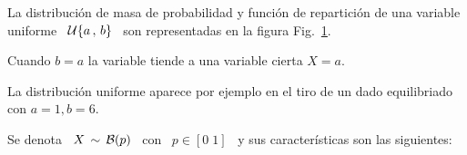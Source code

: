 La distribuci\'on  de masa de probabilidad  y funci\'on de  repartici\'on de una
variable uniforme  \ $\mathcal{U}\{  a \, ,  \, b  \}$ \ son  representadas en  la figura
Fig.~\ref{Fig:MP:UniformeDiscreta}.
%
\begin{figure}[h!]
\begin{center}  \end{center}
% 
\label{Fig:MP:UniformeDiscreta}
\end{figure}

Cuando $b = a$ la variable tiende a una variable cierta $X = a$.

La  distribuci\'on  uniforme  aparece  por   ejemplo  en  el  tiro  de  un  dado
equilibriado con $a = 1, b = 6$.



\label{Sssec:MP:Bernoulli}

Se  denota \  $X \,  \sim \,  \mathcal{B}(p)$ \  con \  $p \in  [0 \;  1]$ \  y sus
caracter\'isticas son las siguientes:

